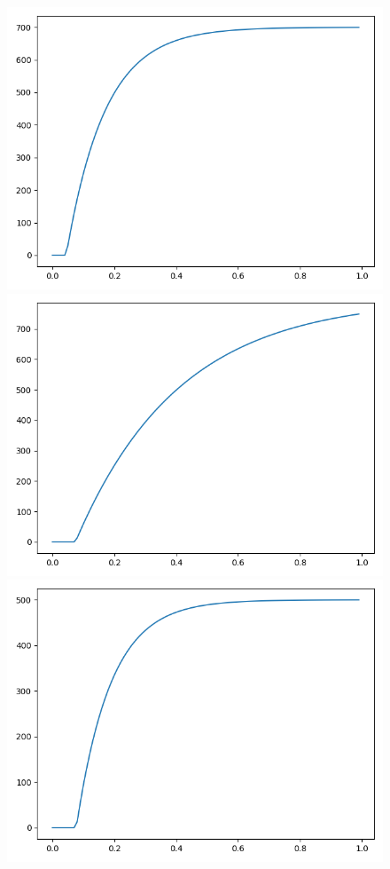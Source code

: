 \begin{figure}[!htb]
    \centering

    \includegraphics[width=\linewidth]{images/phase0.png}
    \endminipage\hfill
    \includegraphics[width=\linewidth]{images/phase1.png}
    \endminipage\hfill
    \includegraphics[width=\linewidth]{images/phase2.png}
    \endminipage\hfill


\end{figure}
